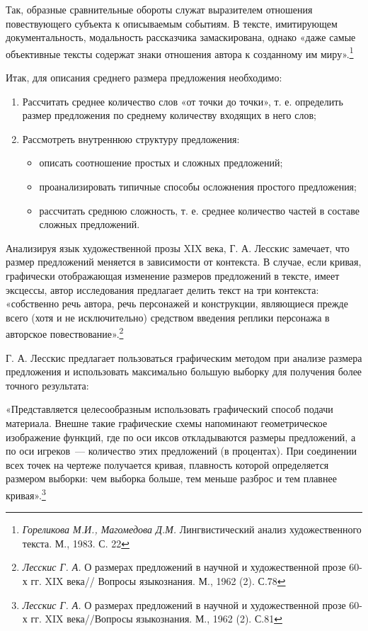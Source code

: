 \documentclass{kursa4}
\begin{document}
{      Так, образные сравнительные обороты служат выразителем отношения повествующего субъекта к описываемым событиям. В тексте, имитирующем документальность, модальность рассказчика замаскирована, однако «даже самые объективные тексты содержат знаки отношения автора к созданному им миру».\footnote{\textit{Гореликова М.И., Магомедова Д.М.} Лингвистический анализ художественного текста. М., 1983. С. 22}  

      Итак, для описания среднего размера предложения необходимо:
      \begin{enumerate}
        \item Рассчитать среднее количество слов «от точки до точки», т. е. определить размер предложения по среднему количеству входящих в него слов;
        \item Рассмотреть внутреннюю структуру предложения: 
        \begin{itemize}
          \item описать соотношение простых и сложных предложений;
          \item проанализировать типичные способы осложнения простого предложения;
          \item рассчитать среднюю сложность, т. е. среднее количество частей в
          составе сложных предложений.
        \end{itemize}
      \end{enumerate}

      Анализируя язык художественной прозы XIX века, Г. А. Лесскис
      замечает, что размер предложений меняется в зависимости от контекста.
      В случае, если кривая, графически отображающая изменение размеров
      предложений в тексте, имеет эксцессы, автор исследования предлагает
      делить текст на три контекста: «собственно речь автора, речь
      персонажей и конструкции, являющиеся прежде всего (хотя и не
      исключительно) средством введения реплики персонажа в авторское
      повествование».\footnote{\textit{{ Лесскис Г. А.
      }}{О размерах предложений в научной и художественной
      прозе 60-х гг. XIX века// Вопросы языкознания. М., 1962 (2). С.78}}

      Г. А. Лесскис предлагает пользоваться графическим методом при
      анализе размера предложения и использовать максимально большую выборку
      для получения более точного результата:

      «Представляется целесообразным использовать
      графический способ подачи материала. Внешне такие графические схемы
      напоминают геометрическое изображение функций, где по оси иксов
      откладываются размеры предложений, а по оси игреков~--- количество этих
      предложений (в процентах). При соединении всех точек на чертеже
      получается кривая, плавность которой определяется размером выборки: чем
      выборка больше, тем меньше разброс и тем плавнее
      кривая».\footnote{\textit{{ Лесскис Г. А.
      }}{О размерах предложений в научной и художественной
      прозе 60-х гг. XIX века//Вопросы языкознания. М., 1962 (2). С.81}}

}
\end{document}
